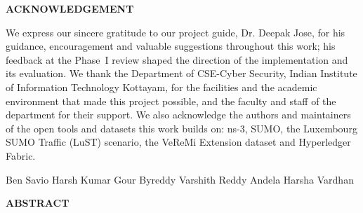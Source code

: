 \documentclass[12pt,a4paper]{report}
\theoremstyle{plain}
\theoremstyle{definition}
\theoremstyle{remark}
\newcommand{\guide}{Dr. Deepak Jose}
\begin{document}
\begin{center}{\large\bf ACKNOWLEDGEMENT}\end{center}

We express our sincere gratitude to our project guide, \guide, for his guidance, encouragement
and valuable suggestions throughout this work; his feedback at the Phase~I review shaped the
direction of the implementation and its evaluation. We thank the Department of CSE-Cyber Security,
Indian Institute of Information Technology Kottayam, for the facilities and the academic environment
that made this project possible, and the faculty and staff of the department for their support.
We also acknowledge the authors and maintainers of the open tools and datasets this work builds on:
ns-3, SUMO, the Luxembourg SUMO Traffic (LuST) scenario, the VeReMi Extension dataset and
Hyperledger Fabric.

\vspace{2cm}
\noindent\hfill Ben Savio \quad Harsh Kumar Gour \quad Byreddy Varshith Reddy \quad Andela Harsha Vardhan
\clearpage

\begin{center}{\Large\bf ABSTRACT}\end{center}

\clearpage

\fussy
\begingroup{}
\tableofcontents
\clearpage
\listoffigures
\let\clearpage\relax
\listoftables
\endgroup


\clearpage
{}\setcounter{page}{1}









\appendix




\end{document}
